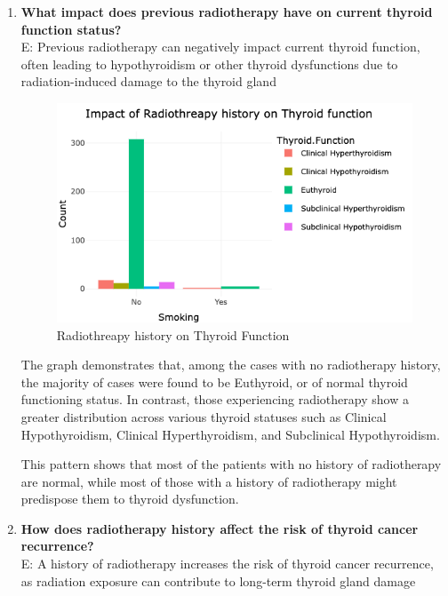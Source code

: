 \documentclass[12pt]{article}
\begin{document}
\begin{enumerate}
       \item \textbf{What impact does previous radiotherapy have on current thyroid function status?}\\
E: Previous radiotherapy can negatively impact current thyroid function, often leading to hypothyroidism or other thyroid dysfunctions due to radiation-induced damage to the thyroid gland

        \begin{figure}[h]
        \vspace{5pt}
        \centering
        \includegraphics[width=1.1\textwidth]{radio with thy.png}  
        \caption{Radiothreapy history on Thyroid Function}
            \label{fig:example}
       \vspace{0.5cm}
    \end{figure}

The graph demonstrates that, among the cases with no radiotherapy history, the majority of cases were found to be Euthyroid, or of normal thyroid functioning status. In contrast, those experiencing radiotherapy show a greater distribution across various thyroid statuses such as Clinical Hypothyroidism, Clinical Hyperthyroidism, and Subclinical Hypothyroidism.

\hspace{9pt}  This pattern shows that most of the patients with no history of radiotherapy are normal, while most of those with a history of radiotherapy might predispose them to thyroid dysfunction.

 

\newpage

       \item \textbf{How does radiotherapy history affect the risk of thyroid cancer recurrence?} \\
       E: A history of radiotherapy increases the risk of thyroid cancer recurrence, as radiation exposure can contribute to long-term thyroid gland damage


\end{enumerate}
\end{document}
